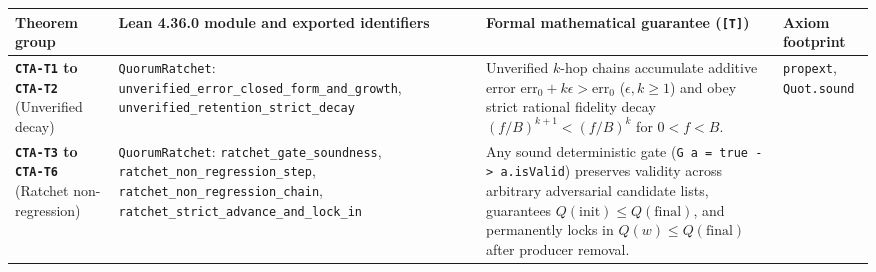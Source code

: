 \documentclass[10pt,letterpaper]{article}
\begin{document}
{\footnotesize\setlength{\tabcolsep}{3.8pt}\renewcommand{\arraystretch}{1.15}
\begin{longtable}[]{@{}
  >{\raggedright\arraybackslash}p{}
  >{\raggedright\arraybackslash}p{}
  >{\raggedright\arraybackslash}p{}
  >{\raggedright\arraybackslash}p{}@{}}
\toprule\noalign{}
\begin{minipage}[b]{\linewidth}\raggedright
\textbf{Theorem group}
\end{minipage} & \begin{minipage}[b]{\linewidth}\raggedright
\textbf{Lean 4.36.0 module and exported identifiers}
\end{minipage} & \begin{minipage}[b]{\linewidth}\raggedright
\textbf{Formal mathematical guarantee (\texttt{{[}T{]}})}
\end{minipage} & \begin{minipage}[b]{\linewidth}\raggedright
\textbf{Axiom footprint}
\end{minipage} \\
\midrule\noalign{}
\endhead
\bottomrule\noalign{}
\endlastfoot
\textbf{\texttt{CTA-T1} to \texttt{CTA-T2}} (Unverified decay) &
\texttt{QuorumRatchet}:
\texttt{unverified\_\allowbreak{}error\_\allowbreak{}closed\_\allowbreak{}form\_\allowbreak{}and\_\allowbreak{}growth},
\texttt{unverified\_\allowbreak{}retention\_\allowbreak{}strict\_\allowbreak{}decay} & Unverified \(k\)-hop
chains accumulate additive error
\(\mathrm{err}_0 + k\epsilon > \mathrm{err}_0\) (\(\epsilon, k \ge 1\))
and obey strict rational fidelity decay \((f/B)^{k+1} < (f/B)^k\) for
\(0 < f < B\). & \texttt{propext}, \texttt{Quot.\allowbreak{}sound} \\
\textbf{\texttt{CTA-T3} to \texttt{CTA-T6}} (Ratchet non-regression) &
\texttt{QuorumRatchet}: \texttt{ratchet\_\allowbreak{}gate\_\allowbreak{}soundness},
\texttt{ratchet\_\allowbreak{}non\_\allowbreak{}regression\_\allowbreak{}step},
\texttt{ratchet\_\allowbreak{}non\_\allowbreak{}regression\_\allowbreak{}chain},
\texttt{ratchet\_\allowbreak{}strict\_\allowbreak{}advance\_\allowbreak{}and\_\allowbreak{}lock\_\allowbreak{}in} & Any sound
deterministic gate (\texttt{G\ a\ =\ true\ -\textgreater{}\ a.isValid})
preserves validity across arbitrary adversarial candidate lists,
guarantees \(Q(\text{init}) \le Q(\text{final})\), and permanently locks
in \(Q(w) \le Q(\text{final})\) after producer removal. &

\end{longtable}}
\end{document}
